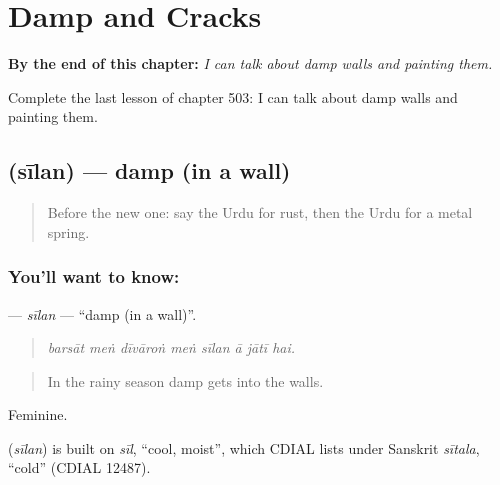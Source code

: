 
\chapter{Damp and Cracks}
\label{ch:ur-damp-and-cracks}

\begin{chapteropening}
\textbf{By the end of this chapter:} \emph{I can talk about damp walls and painting them.}

Complete the last lesson of chapter 503: I can talk about damp walls and painting them.
\end{chapteropening}

\section[\texorpdfstring{\ur{سیلن} (sīlan)}{سیلن (sīlan)}]{ (sīlan) — damp (in a wall)}

\label{lesson:UR-C503-silan}



\begin{quote}
Before the new one: say the Urdu for rust, then the Urdu for a metal spring.
\end{quote}

\subsection*{You'll want to know: }
\textbf{} — \emph{sīlan} — \textquotedblleft{}damp (in a wall)\textquotedblright{}.

\begin{quote}
       
\end{quote}

\begin{quote}
\emph{barsāt meṅ dīvāroṅ meṅ sīlan ā jātī hai.}
\end{quote}

\begin{quote}
In the rainy season damp gets into the walls.
\end{quote}

Feminine.

\begin{cousinweb}
\textbf{} (\emph{sīlan}) is built on \emph{sīl}, \textquotedblleft{}cool, moist\textquotedblright{}, which CDIAL lists under Sanskrit \emph{sītala}, \textquotedblleft{}cold\textquotedblright{} (CDIAL 12487).
\end{cousinweb}


